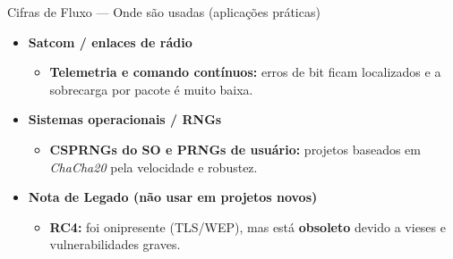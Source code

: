 \documentclass{beamer}
\begin{document}
\begin{frame}{Cifras de Fluxo — Onde são usadas (aplicações práticas)}
\small
\begin{itemize}
    
    \item \textbf{Satcom / enlaces de rádio}
    \begin{itemize}
        \footnotesize
        \item \textbf{Telemetria e comando contínuos:} erros de bit ficam localizados e a sobrecarga por pacote é muito baixa.
    \end{itemize}
    \small
    \item \textbf{Sistemas operacionais / RNGs}
    \begin{itemize}
        \footnotesize
        \item \textbf{CSPRNGs do SO e PRNGs de usuário:} projetos baseados em \textit{ChaCha20} pela velocidade e robustez.
    \end{itemize}
    \small
    \vspace{3em}
    \item \textbf{Nota de Legado (não usar em projetos novos)}
    \begin{itemize}
        \footnotesize
        \item \textbf{RC4:} foi onipresente (TLS/WEP), mas está \textbf{obsoleto} devido a vieses e vulnerabilidades graves.
    \end{itemize}
\end{itemize}
\end{frame}



\end{document}
